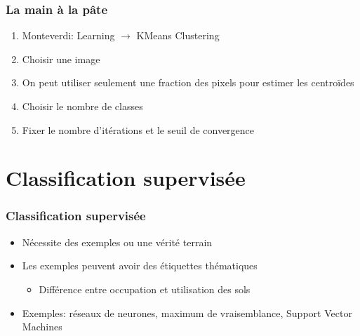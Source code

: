 \documentclass[compress,handout]{beamer}
\begin{document}
\begin{frame}
  \frametitle{La main à la pâte}
  \begin{enumerate}
  \item Monteverdi: Learning $\rightarrow$ KMeans Clustering
  \item Choisir une image
  \item On peut utiliser seulement une fraction des pixels pour
    estimer les centroïdes
  \item Choisir le nombre de classes
  \item Fixer le nombre d'itérations et le seuil de convergence
  \end{enumerate}    
\end{frame}
\section[Supervisé]{Classification supervisée}
\label{sec:supervised}
\begin{frame}
  \frametitle{Classification supervisée}
  \begin{itemize}
  \item Nécessite des exemples ou une vérité terrain
  \item Les exemples peuvent avoir des étiquettes thématiques
    \begin{itemize}
    \item Différence entre occupation et utilisation des sols
    \end{itemize}
  \item Exemples: réseaux de neurones, maximum de vraisemblance, Support Vector Machines
  \end{itemize}
\end{frame}
\end{document}
